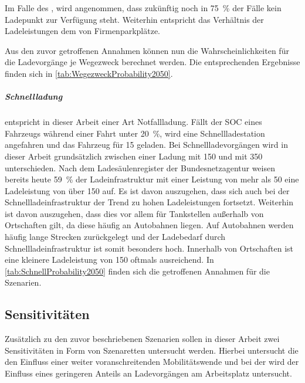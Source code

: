 Im Falle des \UCs \Straszenranddot, wird angenommen, dass zukünftig noch in \SI{75}{\percent} der Fälle kein Ladepunkt zur Verfügung steht.
Weiterhin entspricht das Verhältnis der Ladeleistungen dem von Firmenparkplätze.\medskip

Aus den zuvor getroffenen Annahmen können nun die Wahrscheinlichkeiten für die Ladevorgänge je Wegezweck berechnet werden.
Die entsprechenden Ergebnisse finden sich in \autoref{tab:WegezweckProbability2050}.



\subparagraph{Schnellladung} entspricht in dieser Arbeit einer Art Notfallladung.
Fällt der \gls{SOC} eines Fahrzeugs während einer Fahrt unter \SI{20}{\percent}, wird eine Schnellladestation angefahren und das Fahrzeug für \SI{15}{\Minuten} geladen.
Bei Schnellladevorgängen wird in dieser Arbeit grundsätzlich zwischen einer Ladung mit \SI{150}{\kw} und mit \SI{350}{\kw} unterschieden.
Nach dem Ladesäulenregister der Bundesnetzagentur \cite[][Stand: ]{BundesnetzagenturElektrizitaet2020} weisen bereits heute \SI{59}{\percent} der Ladeinfrastruktur mit einer Leistung von mehr als \SI{50}{\kw} eine Ladeleistung von über \SI{150}{\kw} auf.
Es ist davon auszugehen, dass sich auch bei der Schnellladeinfrastruktur der Trend zu hohen Ladeleistungen fortsetzt.
Weiterhin ist davon auszugehen, dass dies vor allem für Tankstellen außerhalb von Ortschaften gilt, da diese häufig an Autobahnen liegen.
Auf Autobahnen werden häufig lange Strecken zurückgelegt und der Ladebedarf durch Schnellladeinfrastruktur ist somit besonders hoch.
Innerhalb von Ortschaften ist eine kleinere Ladeleistung von \SI{150}{\kw} oftmals ausreichend.
In \autoref{tab:SchnellProbability2050} finden sich die getroffenen Annahmen für die Szenarien.



\subsection{Sensitivitäten}

Zusätzlich zu den zuvor beschriebenen Szenarien sollen in dieser Arbeit zwei Sensitivitäten in Form von Szenaretten untersucht werden.
Hierbei untersucht die \Kleinwagen den Einfluss einer weiter voranschreitenden Mobilitätswende und bei der \SzeFirmenparkplatz wird der Einfluss eines geringeren Anteils an Ladevorgängen am Arbeitsplatz untersucht.

